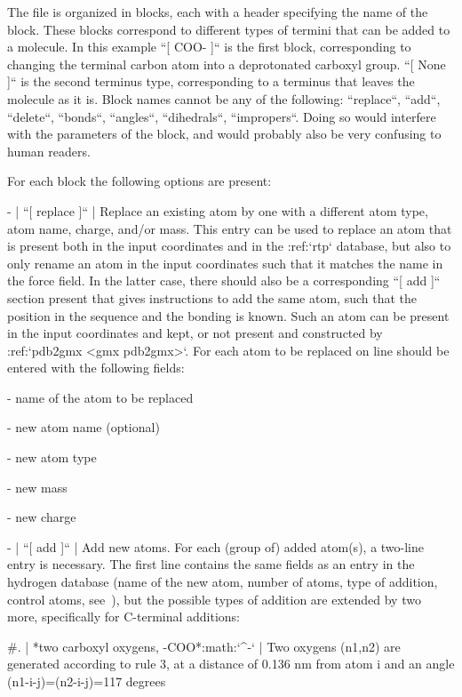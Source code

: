The file is organized in blocks, each with a header specifying the name
of the block. These blocks correspond to different types of termini that
can be added to a molecule. In this example ``[ COO- ]`` is
the first block, corresponding to changing the terminal carbon atom into
a deprotonated carboxyl group. ``[ None ]`` is the second
terminus type, corresponding to a terminus that leaves the molecule as
it is. Block names cannot be any of the following:
``replace``, ``add``, ``delete``,
``bonds``, ``angles``,
``dihedrals``, ``impropers``. Doing so would
interfere with the parameters of the block, and would probably also be
very confusing to human readers.

For each block the following options are present:

-  | ``[ replace ]``
   | Replace an existing atom by one with a different atom type, atom
     name, charge, and/or mass. This entry can be used to replace an
     atom that is present both in the input coordinates and in the
     :ref:`rtp` database, but also to only rename an atom in
     the input coordinates such that it matches the name in the force
     field. In the latter case, there should also be a corresponding
     ``[ add ]`` section present that gives instructions to
     add the same atom, such that the position in the sequence and the
     bonding is known. Such an atom can be present in the input
     coordinates and kept, or not present and constructed by
     :ref:`pdb2gmx <gmx pdb2gmx>`. For each atom to be replaced on line
     should be entered with the following fields:

   -  name of the atom to be replaced

   -  new atom name (optional)

   -  new atom type

   -  new mass

   -  new charge

-  | ``[ add ]``
   | Add new atoms. For each (group of) added atom(s), a two-line entry
     is necessary. The first line contains the same fields as an entry
     in the hydrogen database (name of the new atom, number of atoms,
     type of addition, control atoms,
     see ), but the possible types of
     addition are extended by two more, specifically for C-terminal
     additions:

   #. | *two carboxyl oxygens, -COO*:math:`^-`
      | Two oxygens (n1,n2) are generated according to rule 3, at a
        distance of 0.136 nm from atom i and an angle
        (n1-i-j)=(n2-i-j)=117 degrees

